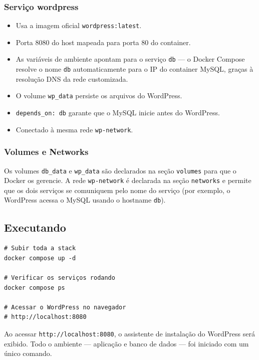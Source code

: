 \subsubsection{Serviço wordpress}

\begin{itemize}
    \item Usa a imagem oficial \texttt{wordpress:latest}.
    \item Porta 8080 do host mapeada para porta 80 do container.
    \item As variáveis de ambiente apontam para o serviço \texttt{db} --- o Docker Compose resolve o nome \texttt{db} automaticamente para o IP do container MySQL, graças à resolução DNS da rede customizada.
    \item O volume \texttt{wp\_data} persiste os arquivos do WordPress.
    \item \texttt{depends\_on: db} garante que o MySQL inicie antes do WordPress.
    \item Conectado à mesma rede \texttt{wp-network}.
\end{itemize}

\subsubsection{Volumes e Networks}

Os volumes \texttt{db\_data} e \texttt{wp\_data} são declarados na seção \texttt{volumes} para que o Docker os gerencie. A rede \texttt{wp-network} é declarada na seção \texttt{networks} e permite que os dois serviços se comuniquem pelo nome do serviço (por exemplo, o WordPress acessa o MySQL usando o hostname \texttt{db}).

\subsection{Executando}

\begin{verbatim}
# Subir toda a stack
docker compose up -d

# Verificar os serviços rodando
docker compose ps

# Acessar o WordPress no navegador
# http://localhost:8080
\end{verbatim}

Ao acessar \texttt{http://localhost:8080}, o assistente de instalação do WordPress será exibido. Todo o ambiente --- aplicação e banco de dados --- foi iniciado com um único comando.

